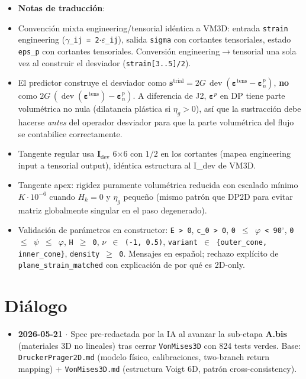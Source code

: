 \documentclass[11pt,letterpaper,oneside]{report}
\begin{document}
\begin{itemize}
  \item \textbf{Notas de traducción}:
  \item Convención mixta engineering/tensorial idéntica a VM3D: entrada \texttt{strain} engineering (\texttt{\ensuremath{\gamma}\_ij = 2\ensuremath{\cdot}\ensuremath{\varepsilon}\_ij}), salida \texttt{sigma} con cortantes tensoriales, estado \texttt{eps\_p} con cortantes tensoriales. Conversión engineering\ensuremath{\to}tensorial una sola vez al construir el desviador (\texttt{strain[3..5]/2}).
  \item El predictor construye el desviador como $\mathbf s^\text{trial} = 2G\,\operatorname{dev}(\boldsymbol\varepsilon^\text{tens} - \boldsymbol\varepsilon^p_n)$, \textbf{no} como $2G\,(\operatorname{dev}(\boldsymbol\varepsilon^\text{tens}) - \boldsymbol\varepsilon^p_n)$. A diferencia de J2, $\boldsymbol\varepsilon^p$ en DP tiene parte volumétrica no nula (dilatancia plástica si $\eta_g > 0$), así que la sustracción debe hacerse \textit{antes} del operador desviador para que la parte volumétrica del flujo se contabilice correctamente.
  \item Tangente regular usa $\mathbf I_\text{dev}$ 6\ensuremath{\times}6 con $1/2$ en los cortantes (mapea engineering input a tensorial output), idéntica estructura al I\_dev de VM3D.
  \item Tangente apex: rigidez puramente volumétrica reducida con escalado mínimo $K \cdot 10^{-6}$ cuando $H_k = 0$ y $\eta_g$ pequeño (mismo patrón que DP2D para evitar matriz globalmente singular en el paso degenerado).
  \item Validación de parámetros en constructor: \texttt{E > 0}, \texttt{c\_0 > 0}, \texttt{0 \ensuremath{\le} \ensuremath{\varphi} < 90\ensuremath{^{\circ}}}, \texttt{0 \ensuremath{\le} \ensuremath{\psi} \ensuremath{\le} \ensuremath{\varphi}}, \texttt{H \ensuremath{\ge} 0}, \texttt{\ensuremath{\nu} \ensuremath{\in} (-1, 0.5)}, \texttt{variant \ensuremath{\in} \{outer\_cone, inner\_cone\}}, \texttt{density \ensuremath{\ge} 0}. Mensajes en español; rechazo explícito de \texttt{plane\_strain\_matched} con explicación de por qué es 2D-only.
\end{itemize}


\section{Diálogo}

\begin{itemize}
  \item \textbf{2026-05-21} \ensuremath{\cdot} Spec pre-redactada por la IA al avanzar la sub-etapa \textbf{A.bis} (materiales 3D no lineales) tras cerrar \texttt{VonMises3D} con 824 tests verdes. Base: \texttt{DruckerPrager2D.md} (modelo físico, calibraciones, two-branch return mapping) + \texttt{VonMises3D.md} (estructura Voigt 6D, patrón cross-consistency).
\end{itemize}
\end{document}
